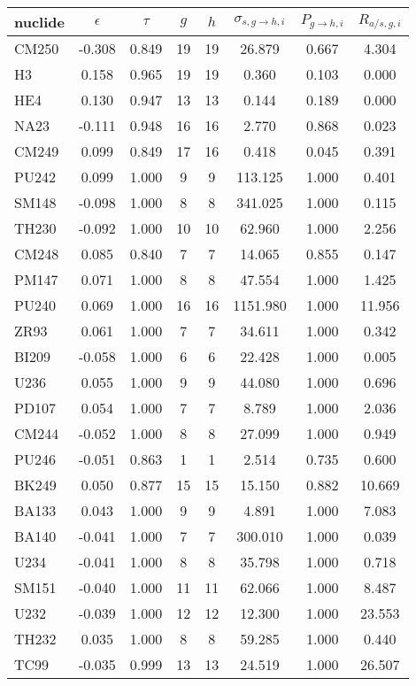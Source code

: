 \begin{tabular}{|l|ccccccc|}
\hline
nuclide & $\epsilon$ & $\tau$ & $g$ & $h$ & $\sigma_{s,g\to h,i}$ & $P_{g\to h,i}$ & $R_{a/s,g,i}$\\
\hline
CM250 & -0.308 & 0.849 & 19 & 19 & 26.879 & 0.667 & 4.304\\
H3 & 0.158 & 0.965 & 19 & 19 & 0.360 & 0.103 & 0.000\\
HE4 & 0.130 & 0.947 & 13 & 13 & 0.144 & 0.189 & 0.000\\
NA23 & -0.111 & 0.948 & 16 & 16 & 2.770 & 0.868 & 0.023\\
CM249 & 0.099 & 0.849 & 17 & 16 & 0.418 & 0.045 & 0.391\\
PU242 & 0.099 & 1.000 & 9 & 9 & 113.125 & 1.000 & 0.401\\
SM148 & -0.098 & 1.000 & 8 & 8 & 341.025 & 1.000 & 0.115\\
TH230 & -0.092 & 1.000 & 10 & 10 & 62.960 & 1.000 & 2.256\\
CM248 & 0.085 & 0.840 & 7 & 7 & 14.065 & 0.855 & 0.147\\
PM147 & 0.071 & 1.000 & 8 & 8 & 47.554 & 1.000 & 1.425\\
PU240 & 0.069 & 1.000 & 16 & 16 & 1151.980 & 1.000 & 11.956\\
ZR93 & 0.061 & 1.000 & 7 & 7 & 34.611 & 1.000 & 0.342\\
BI209 & -0.058 & 1.000 & 6 & 6 & 22.428 & 1.000 & 0.005\\
U236 & 0.055 & 1.000 & 9 & 9 & 44.080 & 1.000 & 0.696\\
PD107 & 0.054 & 1.000 & 7 & 7 & 8.789 & 1.000 & 2.036\\
CM244 & -0.052 & 1.000 & 8 & 8 & 27.099 & 1.000 & 0.949\\
PU246 & -0.051 & 0.863 & 1 & 1 & 2.514 & 0.735 & 0.600\\
BK249 & 0.050 & 0.877 & 15 & 15 & 15.150 & 0.882 & 10.669\\
BA133 & 0.043 & 1.000 & 9 & 9 & 4.891 & 1.000 & 7.083\\
BA140 & -0.041 & 1.000 & 7 & 7 & 300.010 & 1.000 & 0.039\\
U234 & -0.041 & 1.000 & 8 & 8 & 35.798 & 1.000 & 0.718\\
SM151 & -0.040 & 1.000 & 11 & 11 & 62.066 & 1.000 & 8.487\\
U232 & -0.039 & 1.000 & 12 & 12 & 12.300 & 1.000 & 23.553\\
TH232 & 0.035 & 1.000 & 8 & 8 & 59.285 & 1.000 & 0.440\\
TC99 & -0.035 & 0.999 & 13 & 13 & 24.519 & 1.000 & 26.507\\

\end{tabular}
